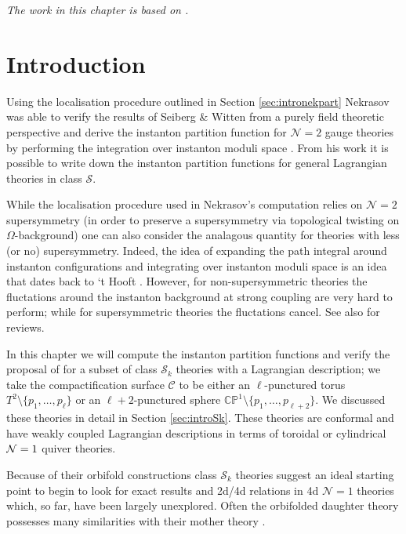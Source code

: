 \documentclass[main.tex]{subfiles}
\begin{document}
 
\textit{The work in this chapter is based on \cite{Bourton:2017pee}.}

\section{Introduction}
Using the localisation procedure outlined in Section \ref{sec:intronekpart} Nekrasov was able to verify the results of Seiberg \& Witten \cite{Seiberg:1994rs,Seiberg:1994aj} from a purely field theoretic perspective and derive the instanton partition function for $\mathcal{N}=2$ gauge theories by performing the integration over instanton moduli space \cite{Nekrasov:2003rj,Nekrasov:2002qd}. From his work it is possible to write down the instanton partition functions for general Lagrangian theories in class $\mathcal{S}$. 

While the localisation procedure used in Nekrasov's computation relies on $\mathcal{N}=2$ supersymmetry (in order to preserve a supersymmetry via topological twisting on $\Omega$-background) one can also consider the analagous quantity for theories with less (or no) supersymmetry. Indeed, the idea of expanding the path integral around instanton configurations and integrating over instanton moduli space is an idea that dates back to `t Hooft \cite{PhysRevD.14.3432}. However, for non-supersymmetric theories the fluctations around the instanton background at strong coupling are very hard to perform; while for supersymmetric theories the fluctations cancel. See also \cite{Tachikawa:2014dja,Dorey:2002ik} for reviews. 

In this chapter we will compute the instanton partition functions and verify the proposal of \cite{Mitev:2017jqj} for a subset of class $\mathcal{S}_k$ theories with a Lagrangian description; we take the compactification surface $\mathcal{C}$ to be either an $\ell$-punctured torus $T^2\setminus\{p_1,\dots,p_\ell\}$ or an $\ell+2$-punctured sphere $\mathbb{CP}^1\setminus\{p_1,\dots,p_{\ell+2}\}$. We discussed these theories in detail in Section \ref{sec:introSk}. These theories are conformal and have weakly coupled Lagrangian descriptions in terms of toroidal  or cylindrical $\mathcal{N}=1$ quiver theories. 

Because of their orbifold constructions class $\mathcal{S}_k$ theories suggest an ideal starting point to begin to look for exact results and 2d/4d relations in 4d $\mathcal{N}=1$ theories which, so far, have been largely unexplored. Often the orbifolded daughter theory possesses many similarities with their mother theory \cite{Bershadsky:1998mb,Bershadsky:1998cb}.
\end{document}
